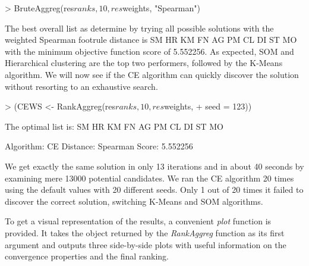 \documentclass[11pt]{article}
\begin{document}
\begin{Schunk}
\begin{Sinput}
> BruteAggreg(res$ranks, 10, res$weights, "Spearman")
\end{Sinput}
\end{Schunk}
The best overall list as determine by trying all possible solutions with the weighted Spearman footrule distance is 
SM HR KM FN AG PM CL DI ST MO with the minimum objective function score of
5.552256. As expected, SOM and Hierarchical clustering are the top two performers, followed by the K-Means algorithm. 
We will now see if the CE algorithm can quickly discover the solution without resorting to an exhaustive search.


\begin{Schunk}
\begin{Sinput}
> (CEWS <- RankAggreg(res$ranks, 10, res$weights, 
+     seed = 123))
\end{Sinput}
\end{Schunk}

\begin{Schunk}
\begin{Soutput}
The optimal list is: 
        SM HR KM FN AG PM CL DI ST MO

  Algorithm:   CE
  Distance:    Spearman
  Score:       5.552256 
\end{Soutput}
\end{Schunk}
We get exactly the same solution in only 13 iterations and in about 40 seconds by examining mere 13000 potential candidates.
We ran the CE algorithm 20 times using the default values with 20 different seeds. Only 1 out of 20 times it failed to discover the 
correct solution, switching K-Means and SOM algorithms. 

To get a visual representation of the results, a convenient \emph{plot} function is provided. It takes the 
object returned by the \emph{RankAggreg} function as its first argument and outputs three side-by-side plots with useful information
on the convergence properties and the final ranking.
\end{document}
